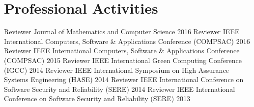 \section{Professional Activities}
\begin{cvhonors}
  \cvhonor
    {Reviewer}
    {Journal of Mathematics and Computer Science}
    {}
    {2016}
  \cvhonor
    {Reviewer}
    {IEEE International Computers, Software \& Applications Conference (COMPSAC)}
    {}
    {2016}
  \cvhonor
    {Reviewer}
    {IEEE International Computers, Software \& Applications Conference (COMPSAC)}
    {}
    {2015}
  \cvhonor
    {Reviewer}
    {IEEE International Green Computing Conference (IGCC)}
    {}
    {2014}
  \cvhonor
    {Reviewer}
    {IEEE International Symposium on High Assurance Systems Engineering (HASE)}
    {}
    {2014}
  \cvhonor
    {Reviewer}
    {IEEE International Conference on Software Security and Reliability (SERE)}
    {}
    {2014}
  \cvhonor
    {Reviewer}
    {IEEE International Conference on Software Security and Reliability (SERE)}
    {}
    {2013}
\end{cvhonors} 